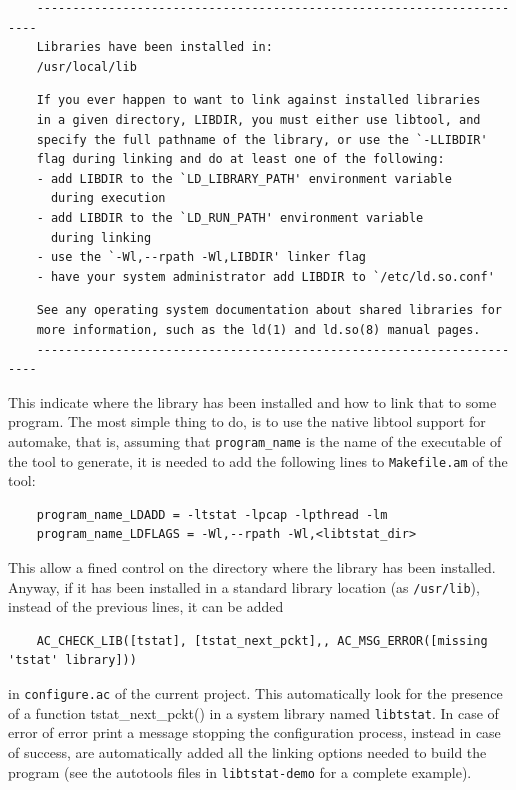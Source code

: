 \documentclass[11pt]{article}
\begin{document}
\begin{small}\begin{verbatim}
    ----------------------------------------------------------------------
    Libraries have been installed in:
    /usr/local/lib
\end{verbatim}\end{small} \noindent
\begin{small}\begin{verbatim}
    If you ever happen to want to link against installed libraries
    in a given directory, LIBDIR, you must either use libtool, and
    specify the full pathname of the library, or use the `-LLIBDIR'
    flag during linking and do at least one of the following:
    - add LIBDIR to the `LD_LIBRARY_PATH' environment variable
      during execution
    - add LIBDIR to the `LD_RUN_PATH' environment variable
      during linking
    - use the `-Wl,--rpath -Wl,LIBDIR' linker flag
    - have your system administrator add LIBDIR to `/etc/ld.so.conf'
\end{verbatim}\end{small} \noindent
\begin{small}\begin{verbatim}
    See any operating system documentation about shared libraries for
    more information, such as the ld(1) and ld.so(8) manual pages.
    ----------------------------------------------------------------------
\end{verbatim}\end{small} \noindent
This indicate where the library has been installed and how to
link that to some program. The most simple thing to do, is to 
use the native libtool support for automake, that is, assuming
that \texttt{program\_name} is the name of the executable of the tool
to generate, it is needed to add the following lines to \texttt{Makefile.am}
of the tool:

\begin{small}\begin{verbatim}
    program_name_LDADD = -ltstat -lpcap -lpthread -lm
    program_name_LDFLAGS = -Wl,--rpath -Wl,<libtstat_dir>
\end{verbatim}\end{small} \noindent
This allow a fined control on the directory where the library 
has been installed. Anyway, if it has been installed in a
standard library location (as \texttt{/usr/lib}), instead of the previous
lines, it can be added

\begin{small}\begin{verbatim}
    AC_CHECK_LIB([tstat], [tstat_next_pckt],, AC_MSG_ERROR([missing 'tstat' library]))
\end{verbatim}\end{small} \noindent
in \texttt{configure.ac} of the current project. This automatically
look for the presence of a function tstat\_next\_pckt() in a system library
named \texttt{libtstat}. In case of error of error print a message stopping the
configuration process, instead in case of success, are automatically added
all the linking options needed to build the program (see the autotools 
files in \texttt{libtstat-demo} for a complete example).
\end{document}
